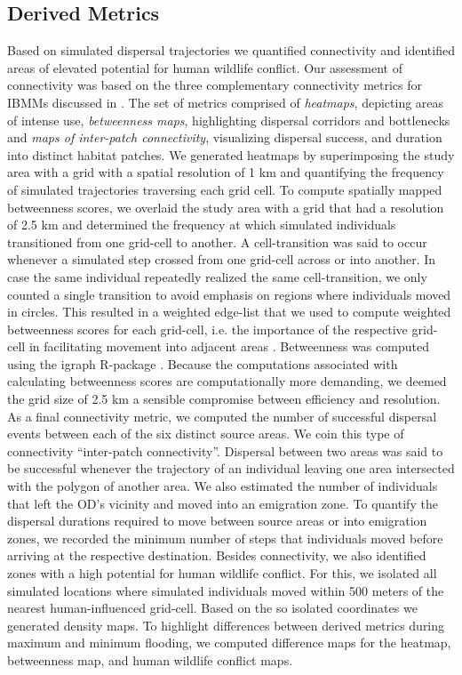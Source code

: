 \documentclass[abstract=on,10pt,a4paper,bibliography=totocnumbered]{article}
\begin{document}
\subsection{Derived Metrics}
Based on simulated dispersal trajectories we quantified connectivity and
identified areas of elevated potential for human wildlife conflict. Our
assessment of connectivity was based on the three complementary connectivity
metrics for IBMMs discussed in \cite{Hofmann.2023}. The set of metrics comprised
of \textit{heatmaps}, depicting areas of intense use, \textit{betweenness maps},
highlighting dispersal corridors and bottlenecks and \textit{maps of inter-patch
 connectivity}, visualizing dispersal success, and duration into distinct habitat
patches. We generated heatmaps by superimposing the study area with a grid with
a spatial resolution of 1 km and quantifying the frequency of simulated
trajectories traversing each grid cell. To compute spatially mapped betweenness
scores, we overlaid the study area with a grid that had a resolution of 2.5 km
and determined the frequency at which simulated individuals transitioned from
one grid-cell to another. A cell-transition was said to occur whenever a
simulated step crossed from one grid-cell across or into another. In case the
same individual repeatedly realized the same cell-transition, we only counted a
single transition to avoid emphasis on regions where individuals moved in
circles. This resulted in a weighted edge-list that we used to compute weighted
betweenness scores for each grid-cell, i.e. the importance of the respective
grid-cell in facilitating movement into adjacent areas
\citep{Bastille-Rousseau.2018, Bastille-Rousseau.2021}. Betweenness was computed
using the \textsf{igraph} R-package \citep{Csardi.2006}. Because the
computations associated with calculating betweenness scores are computationally
more demanding, we deemed the grid size of 2.5 km a sensible compromise between
efficiency and resolution. As a final connectivity metric, we computed the
number of successful dispersal events between each of the six distinct source
areas. We coin this type of connectivity ``inter-patch connectivity''. Dispersal
between two areas was said to be successful whenever the trajectory of an
individual leaving one area intersected with the polygon of another area. We
also estimated the number of individuals that left the OD's vicinity and moved
into an emigration zone. To quantify the dispersal durations required to move
between source areas or into emigration zones, we recorded the minimum number of
steps that individuals moved before arriving at the respective destination.
Besides connectivity, we also identified zones with a high potential for human
wildlife conflict. For this, we isolated all simulated locations where simulated
individuals moved within 500 meters of the nearest human-influenced grid-cell.
Based on the so isolated coordinates we generated density maps. To highlight
differences between derived metrics during maximum and minimum flooding, we
computed difference maps for the heatmap, betweenness map, and human wildlife
conflict maps.
\end{document}
